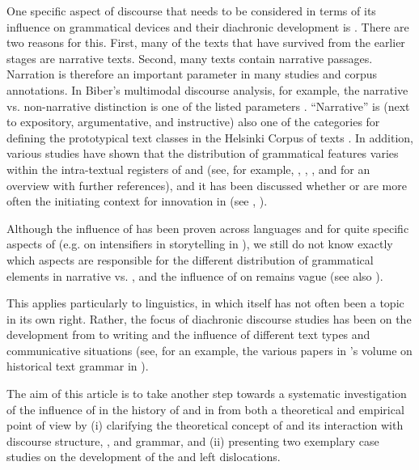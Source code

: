 \documentclass[output=paper,colorlinks,citecolor=brown]{langscibook}
\begin{document}
One specific aspect of discourse that needs to be considered in terms of its influence on grammatical devices and their diachronic development is . There are two reasons for this. First, many of the texts that have survived from the earlier stages are narrative texts. Second, many texts contain narrative passages. Narration is therefore an important parameter in many studies and corpus annotations. In Biber's multimodal discourse analysis, for example, the narrative vs. non-narrative distinction is one of the listed parameters \citep[e.g.][]{BiberConrad2019}. “Narrative” is (next to expository, argumentative, and instructive) also one of the categories for defining the prototypical text classes in the Helsinki Corpus of  texts \citep[138]{Kytö2019}. In addition, various studies have shown that the distribution of grammatical features varies within the intra-textual registers of  and  (see, for example, \citealt{Padučeva2011}, \citealt{MazziottaGlikman2019}, \citealt{EgbertMahlberg2020}, and \citealt[2]{Larrivée2022} for an overview with further references), and it has been discussed whether  or  are more often the initiating context for innovation in  (see \citealt{BrownTagliamonte2012}, \citealt{MazziottaGlikman2019}). 

Although the influence of  has been proven across languages and for quite specific aspects of  (e.g. on intensifiers in storytelling in \citealt{BrownTagliamonte2012}), we still do not know exactly which aspects are responsible for the different distribution of grammatical elements in narrative vs. , and the influence of  on  remains vague (see also \citealt[2]{Larrivée2022}). 

This applies particularly to  linguistics, in which  itself has not often been a topic in its own right. Rather, the focus of diachronic discourse studies has been on the development from  to writing and the influence of different text types and communicative situations (see, for an example, the various papers in \citet{Ziegler2010}'s volume on historical text grammar in ). 

The aim of this article is to take another step towards a systematic investigation of the influence of  in the history of  and in  from both a theoretical and empirical point of view by (i) clarifying the theoretical concept of  and its interaction with discourse structure, , and grammar, and (ii) presenting two exemplary case studies on the development of the  and left dislocations.
\end{document}
